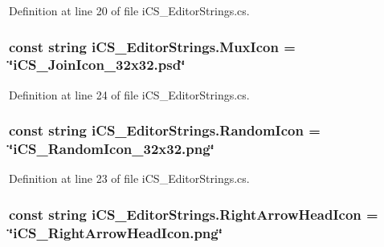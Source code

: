 Definition at line 20 of file i\+C\+S\+\_\+\+Editor\+Strings.\+cs.

\hypertarget{classi_c_s___editor_strings_ae5c2615a613257235005b834a92ecdef}{
\subsubsection[{Mux\+Icon}]{\setlength{\rightskip}{0pt plus 5cm}const string i\+C\+S\+\_\+\+Editor\+Strings.\+Mux\+Icon = \char`\"{}i\+C\+S\+\_\+\+Join\+Icon\+\_\+32x32.\+psd\char`\"{}}}\label{classi_c_s___editor_strings_ae5c2615a613257235005b834a92ecdef}


Definition at line 24 of file i\+C\+S\+\_\+\+Editor\+Strings.\+cs.

\hypertarget{classi_c_s___editor_strings_a646229a3255e50adfbe125878665b921}{
\subsubsection[{Random\+Icon}]{\setlength{\rightskip}{0pt plus 5cm}const string i\+C\+S\+\_\+\+Editor\+Strings.\+Random\+Icon = \char`\"{}i\+C\+S\+\_\+\+Random\+Icon\+\_\+32x32.\+png\char`\"{}}}\label{classi_c_s___editor_strings_a646229a3255e50adfbe125878665b921}


Definition at line 23 of file i\+C\+S\+\_\+\+Editor\+Strings.\+cs.

\hypertarget{classi_c_s___editor_strings_aae609372d1b0aeb705a10cfbcb9f220b}{
\subsubsection[{Right\+Arrow\+Head\+Icon}]{\setlength{\rightskip}{0pt plus 5cm}const string i\+C\+S\+\_\+\+Editor\+Strings.\+Right\+Arrow\+Head\+Icon = \char`\"{}i\+C\+S\+\_\+\+Right\+Arrow\+Head\+Icon.\+png\char`\"{}}}\label{classi_c_s___editor_strings_aae609372d1b0aeb705a10cfbcb9f220b}


